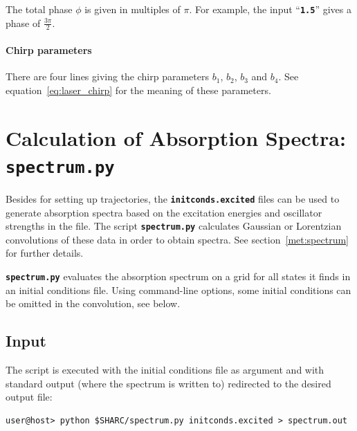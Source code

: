 \documentclass[a4paper,11pt,DIV=15,openany,twoside=false]{scrbook}
\newcommand{\ttt}[1]{\textbf{\texttt{#1}}}
\begin{document}
The total phase $\phi$ is given in multiples of $\pi$. For example, the input ``\ttt{1.5}'' gives a phase of $\frac{3\pi}{2}$.

\paragraph{Chirp parameters}

There are four lines giving the chirp parameters $b_1$, $b_2$, $b_3$ and $b_4$. See equation~\eqref{eq:laser_chirp} for the meaning of these parameters.



\section{Calculation of Absorption Spectra: \ttt{spectrum.py}}\label{sec:spectrum.py}

Besides for setting up trajectories, the \ttt{initconds.excited} files can be used to generate absorption spectra based on the excitation energies and oscillator strengths in the file. The script \ttt{spectrum.py} calculates Gaussian or Lorentzian convolutions of these data in order to obtain spectra. See section~\ref{met:spectrum} for further details.

\ttt{spectrum.py} evaluates the absorption spectrum on a grid for all states it finds in an initial conditions file. Using command-line options, some initial conditions can be omitted in the convolution, see below.

\subsection{Input}

The script is executed with the initial conditions file as argument and with standard output (where the spectrum is written to) redirected to the desired output file:
\begin{verbatim}
user@host> python $SHARC/spectrum.py initconds.excited > spectrum.out
\end{verbatim}
\end{document}
